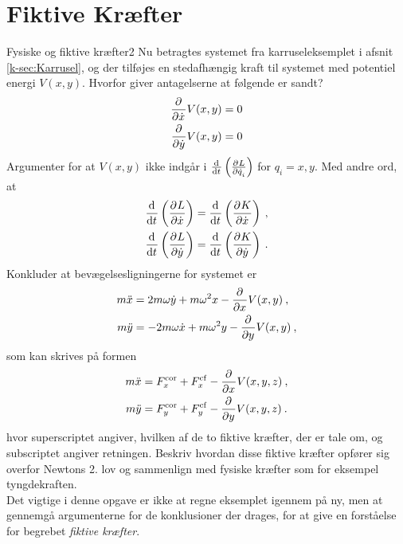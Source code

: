\section*{Fiktive Kræfter}
%
%
\begin{opgave}{Fysiske og fiktive kræfter}{2} \label{opg:Fiktivekraefter}
Nu betragtes systemet fra karruseleksemplet i afsnit \ref{k-sec:Karrusel}, og der tilføjes en stedafhængig kraft til systemet med potentiel energi $V(x,y)$.
\opg Hvorfor giver antagelserne at følgende er sandt?
\begin{align*}
	\pdif{\dt{x}}{}V(x,y) &= 0 \\
	\pdif{\dt{y}}{}V(x,y) &= 0
\end{align*}
\opg Argumenter for at $V(x,y)$ ikke indgår i $\el{\dt{q}_i}$ for $q_i=x,y$. Med andre ord, at
\begin{align*}
	\el{\dt{x}} &= \dif{t}{}\left(\pdif{\dt{x}}{K}\right) \: , \\
	\el{\dt{y}} &= \dif{t}{}\left(\pdif{\dt{y}}{K}\right) \: .
\end{align*}
\opg Konkluder at bevægelsesligningerne for systemet er
\begin{align*}
	m\ddt{x} &= 2m\omega\dt{y} + m\omega^2x -\pdif{x}{}V(x,y) \: , \\
	m\ddt{y} &= -2m\omega\dt{x} + m\omega^2y -\pdif{y}{}V(x,y) \: ,
\end{align*}
som kan skrives på formen
\begin{align*}
	m\ddt{x} &= F_x^\mathrm{cor} + F_x^\mathrm{cf} - \pdif{x}{}V(x,y,z) \: , \\
	m\ddt{y} &= F_y^\mathrm{cor} + F_y^\mathrm{cf} - \pdif{y}{}V(x,y,z) \: .
\end{align*}
hvor superscriptet angiver, hvilken af de to fiktive kræfter, der er tale om, og subscriptet angiver retningen.
\opg Beskriv hvordan disse fiktive kræfter opfører sig overfor Newtons 2. lov og sammenlign med fysiske kræfter som for eksempel tyngdekraften. \vspace{3mm}\\
Det vigtige i denne opgave er ikke at regne eksemplet igennem på ny, men at gennemgå argumenterne for de konklusioner der drages, for at give en forståelse for begrebet \textit{fiktive kræfter}.
\end{opgave}
%
%
